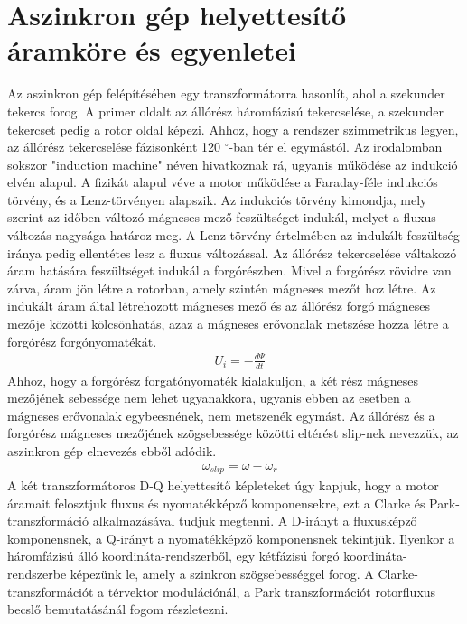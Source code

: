 \documentclass[a4paper,12pt]{article}
\begin{document}
	\section{Aszinkron gép helyettesítő áramköre és egyenletei }
	
	Az aszinkron gép felépítésében egy transzformátorra hasonlít, ahol a szekunder tekercs forog. A primer oldalt az állórész háromfázisú tekercselése, a szekunder tekercset pedig a rotor oldal képezi. Ahhoz, hogy a rendszer szimmetrikus legyen, az állórész tekercselése fázisonként 120 $^{\circ}$-ban tér el egymástól. Az irodalomban sokszor "induction machine" néven hivatkoznak rá, ugyanis működése az indukció elvén alapul. A fizikát alapul véve a motor működése a Faraday-féle indukciós törvény, és a Lenz-törvényen alapszik. Az indukciós törvény kimondja, mely szerint az időben változó mágneses mező feszültséget indukál, melyet a fluxus változás nagysága határoz meg. A Lenz-törvény értelmében az indukált feszültség iránya pedig ellentétes lesz a fluxus változással. Az állórész tekercselése váltakozó áram hatására feszültséget indukál a forgórészben. Mivel a forgórész rövidre van zárva, áram jön létre a rotorban, amely szintén mágneses mezőt hoz létre. Az indukált áram által létrehozott mágneses mező és az állórész forgó mágneses mezője közötti kölcsönhatás, azaz a mágneses erővonalak metszése hozza létre a forgórész forgónyomatékát.
	\begin{align}
		& U_i = -\frac{d \Psi}{dt}
	\end{align}
	Ahhoz, hogy a forgórész forgatónyomaték kialakuljon, a két rész mágneses mezőjének sebessége nem lehet ugyanakkora, ugyanis ebben az esetben a mágneses erővonalak egybeesnének, nem metszenék egymást. Az állórész és a forgórész mágneses mezőjének szögsebessége közötti eltérést slip-nek nevezzük, az aszinkron gép elnevezés ebből adódik.
	\begin{align}
		& \omega_{slip} = \omega - \omega_{r}
	\end{align}
	A két transzformátoros D-Q helyettesítő képleteket úgy kapjuk, hogy a motor áramait felosztjuk fluxus és nyomatékképző komponensekre, ezt a Clarke és Park-transzformáció alkalmazásával tudjuk megtenni. A D-irányt a fluxusképző komponensnek, a Q-irányt a nyomatékképző komponensnek tekintjük. Ilyenkor a háromfázisú álló koordináta-rendszerből, egy kétfázisú forgó koordináta-rendszerbe képezünk le, amely a szinkron szögsebességgel forog. A Clarke-transzformációt a térvektor modulációnál, a Park transzformációt rotorfluxus becslő bemutatásánál fogom részletezni. 
\end{document}
